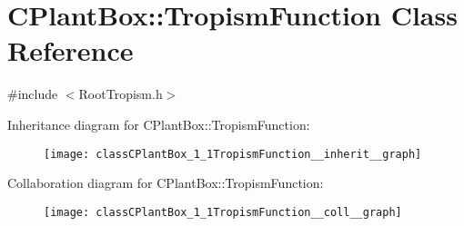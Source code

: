 \hypertarget{classCPlantBox_1_1TropismFunction}{}\section{C\+Plant\+Box\+:\+:Tropism\+Function Class Reference}
\label{classCPlantBox_1_1TropismFunction}


{\ttfamily \#include $<$Root\+Tropism.\+h$>$}



Inheritance diagram for C\+Plant\+Box\+:\+:Tropism\+Function\+:\nopagebreak
\begin{figure}[H]
\begin{center}
\leavevmode
\texttt{[image: classCPlantBox\_1\_1TropismFunction\_\_inherit\_\_graph]}
\end{center}
\end{figure}


Collaboration diagram for C\+Plant\+Box\+:\+:Tropism\+Function\+:\nopagebreak
\begin{figure}[H]
\begin{center}
\leavevmode
\texttt{[image: classCPlantBox\_1\_1TropismFunction\_\_coll\_\_graph]}
\end{center}
\end{figure}
